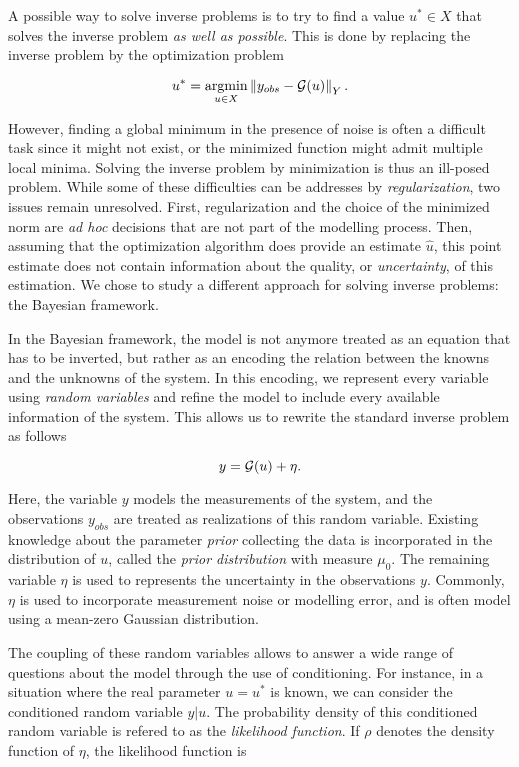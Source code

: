 A possible way to solve inverse problems is to try to find a value $u^* \in X$ that solves the inverse problem \textit{as well as possible}. This is done by replacing the inverse problem by the optimization problem

\begin{equation*}
  u^* = \underset{u \in X}{\text{argmin}} \left\lVert y_{obs} - \mathcal{G}(u) \right\rVert_Y.
\end{equation*}

However, finding a global minimum in the presence of noise is often a difficult task since it might not exist, or the minimized function might admit multiple local minima. Solving the inverse problem by minimization is thus an ill-posed problem. While some of these difficulties can be addresses by \textit{regularization}, two issues remain unresolved. First, regularization and the choice of the minimized norm are \textit{ad hoc} decisions that are not part of the modelling process. Then, assuming that the optimization algorithm does provide an estimate $\hat u$, this point estimate does not contain information about the quality, or \textit{uncertainty}, of this estimation. We chose to study a different approach for solving inverse problems: the Bayesian framework.


In the Bayesian framework, the model is not anymore treated as an equation that has to be inverted, but rather as an encoding the relation between the knowns and the unknowns of the system. In this encoding, we represent every variable using \textit{random variables} and refine the model to include every available information of the system. This allows us to rewrite the standard inverse problem as follows

\begin{equation}
  y = \mathcal{G}(u) + \eta.
\end{equation}

Here, the variable $y$ models the measurements of the system, and the observations $y_{obs}$ are treated as realizations of this random variable. Existing knowledge about the parameter \textit{prior} collecting the data is incorporated in the distribution of $u$, called the \textit{prior distribution} with measure $\mu_0$. The remaining variable $\eta$ is used to represents the uncertainty in the observations $y$. Commonly, $\eta$ is used to incorporate measurement noise or modelling error, and is often model using a mean-zero Gaussian distribution.

The coupling of these random variables allows to answer a wide range of questions about the model through the use of conditioning. For instance, in a situation where the real parameter $u = u^*$ is known, we can consider the conditioned random variable $y|u$. The probability density of this conditioned random variable is refered to as the \textit{likelihood function}. If  $\rho$ denotes the density function of $\eta$, the likelihood function is

